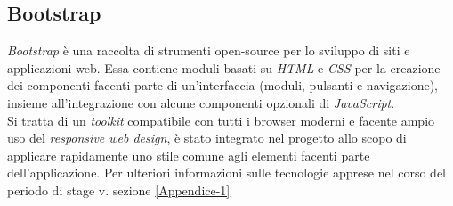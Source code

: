 \subsection{Bootstrap}
\textit{Bootstrap} è una raccolta di strumenti \gls{open-source} per lo sviluppo di siti e applicazioni web. Essa contiene moduli basati su \textit{HTML} e \textit{CSS} per la creazione dei componenti facenti parte di un'interfaccia (moduli, pulsanti e navigazione), insieme all'integrazione con alcune componenti opzionali di \textit{JavaScript}.\\
Si tratta di un \textit{toolkit} compatibile con tutti i browser moderni e facente ampio uso del \textit{responsive web design}, è stato integrato nel progetto allo scopo di applicare rapidamente uno stile comune agli elementi facenti parte dell'applicazione.
\bigbreak
\noindent
Per ulteriori informazioni sulle tecnologie apprese nel corso del periodo di stage v. sezione \ref{Appendice-1}
